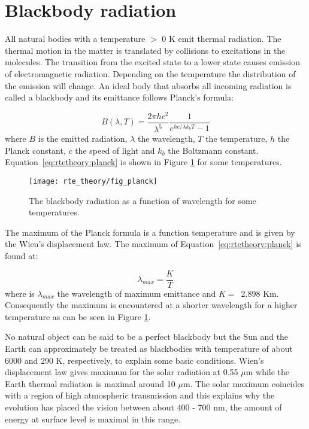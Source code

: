 \section{Blackbody radiation}
 \label{sec:rtetheory:planck}
 
 All natural bodies with a temperature $>$ 0 K emit thermal radiation.
 The thermal motion in the matter is translated by collisions to
 excitations in the molecules. The transition from the excited state
 to a lower state causes emission of electromagnetic radiation.
 Depending on the temperature the distribution of the emission will
 change. An ideal body that absorbs all incoming radiation is called a
 blackbody and its emittance follows Planck's formula: 

 \begin{equation}
   B(\lambda,T) = \frac{2\pi hc^2}{\lambda^5} \frac{1}{e^{hc/\lambda k_bT}-1}
  \label{eq:rtetheory:planck}
 \end{equation}
 where $B$ is the emitted radiation, $\lambda$ the wavelength, $T$ the 
 temperature, $h$ the Planck constant, $c$ the speed of light and $k_b$
 the Boltzmann constant. Equation~\ref{eq:rtetheory:planck} is shown in Figure 
 \ref{fig:rtetheory:planck} for some temperatures.

 \begin{figure}
  \begin{center}
   \texttt{[image: rte\_theory/fig\_planck]}
    \caption{The blackbody radiation as a function of wavelength for
             some temperatures.}
    \label{fig:rtetheory:planck}
  \end{center}
 \end{figure}   
                                       
 The maximum of the Planck formula is a function temperature and is
 given by the Wien's displacement law. The maximum of
 Equation~\ref{eq:rtetheory:planck} is found at: 

 \begin{equation}
   \lambda_{max} = \frac{K}{T}
  \label{eq:rtetheory:wien}
 \end{equation}
 where is $\lambda_{max}$ the wavelength of maximum emittance and $K
 =$~2.898 Km. Consequently the maximum is encountered
 at a shorter wavelength for a higher temperature as can be seen in
 Figure \ref{fig:rtetheory:planck}.
                                     
 No natural object can be said to be a perfect blackbody but the Sun
 and the Earth can approximately be treated as blackbodies with
 temperature of about 6000 and 290 K, respectively, to explain some
 basic conditions. Wien's displacement law gives maximum for the solar
 radiation at 0.55 $\mu$m while the Earth thermal radiation is maximal
 around 10 $\mu$m. The solar maximum coincides with a region of high
 atmospheric transmission and this explains why the
 evolution has placed the vision between about 400 - 700 nm, the
 amount of energy at surface level is maximal in this range.  
 
